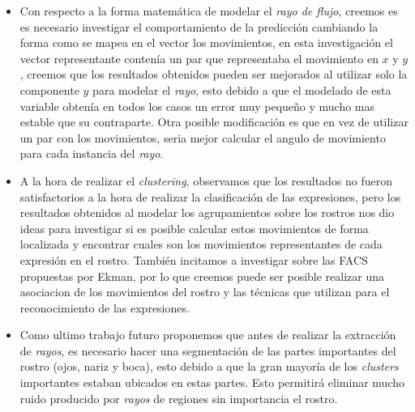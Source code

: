\begin{itemize}
	
	\item Con respecto a la forma matemática de modelar el \textit{rayo de flujo}, creemos es es necesario investigar el comportamiento de la predicción cambiando la forma como se mapea en el vector los movimientos, en esta investigación el vector representante contenía un par que representaba el movimiento en $x$ y $y$, creemos que los resultados obtenidos pueden ser mejorados al utilizar solo la componente $y$ para modelar el \textit{rayo}, esto debido a que el modelado de esta variable obtenía en todos los casos un error muy pequeño y mucho mas estable que su contraparte. Otra posible modificación es que en vez de utilizar un par con los movimientos, seria mejor calcular el angulo de movimiento para cada instancia del \textit{rayo}.
	
	\item A la hora de realizar el \textit{clustering}, observamos que los resultados no fueron satisfactorios a la hora de realizar la clasificación de las expresiones, pero los resultados obtenidos al modelar los agrupamientos sobre los rostros nos dio ideas para investigar si es posible calcular estos movimientos de forma localizada y encontrar cuales son los movimientos representantes de cada expresión en el rostro. También incitamos a investigar sobre las FACS propuestas por Ekman, por lo que creemos puede ser posible realizar una asociacion de los movimientos del rostro y las técnicas que utilizan para el reconocimiento de las expresiones.
	
	\item Como ultimo trabajo futuro proponemos que antes de realizar la extracción de \textit{rayos}, es necesario hacer una segmentación de las partes importantes del rostro (ojos, nariz y boca), esto debido a que la gran mayoría de los \textit{clusters} importantes estaban ubicados en estas partes. Esto permitirá eliminar mucho ruido producido por \textit{rayos} de regiones sin importancia el rostro.
	
\end{itemize}